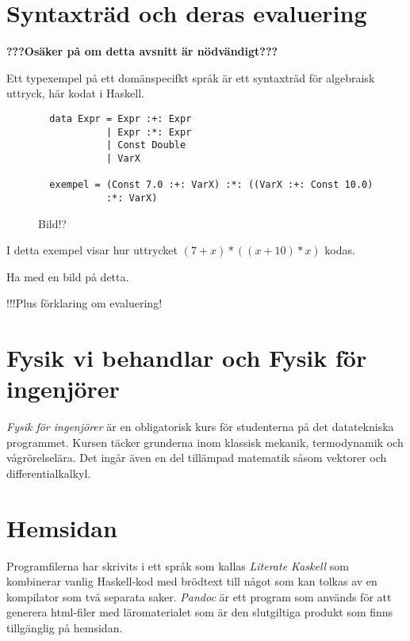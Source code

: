 \section{Syntaxträd och deras evaluering}

\textbf{???Osäker på om detta avsnitt är nödvändigt???}



Ett typexempel på ett domänspecifkt språk är ett syntaxträd för algebraisk uttryck, här kodat i Haskell.

\begin{figure}
  \begin{lstlisting}
  data Expr = Expr :+: Expr
            | Expr :*: Expr
            | Const Double
            | VarX

  exempel = (Const 7.0 :+: VarX) :*: ((VarX :+: Const 10.0)
            :*: VarX)
  \end{lstlisting}
  \caption{Bild!?}
  \label{fig:syntax_exempel}
\end{figure}

I detta exempel visar hur uttrycket $(7+x)*((x+10)*x)$ kodas.

Ha med en bild på detta.

!!!Plus förklaring om evaluering!


\section{Fysik vi behandlar och Fysik för ingenjörer}

\begin{draft}
  \emph{Fysik för ingenjörer} är en obligatorisk kurs för studenterna på det
  datatekniska programmet. Kursen täcker grunderna inom  klassisk
  mekanik, termodynamik och vågrörelselära. Det ingår även en del tillämpad
  matematik såsom vektorer och differentialkalkyl.
\end{draft}

\section{Hemsidan}
\begin{draft}
  Programfilerna har skrivits i ett språk som kallas \textit{Literate Kaskell}
  som kombinerar vanlig Haskell-kod med brödtext till något som kan tolkas av en
  kompilator som två separata saker. \textit{Pandoc} är ett program som används
  för att generera html-filer med läromaterialet som är den slutgiltiga produkt
  som finns tillgänglig på hemsidan.
\end{draft}

